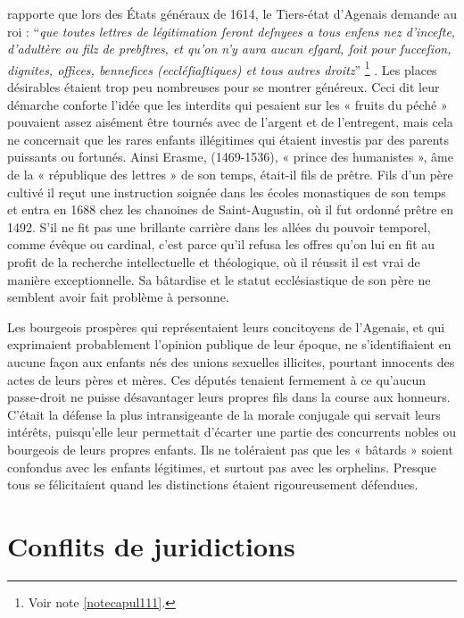   rapporte que lors des États généraux de 1614, le Tiers-état d'Agenais demande au roi : \enquote{\emph{que toutes lettres de légitimation ſeront deſnyees a tous enfens nez d'inceſte, d'adultère ou filz de prebſtres, et qu'on n'y aura aucun eſgard, ſoit pour ſucceſion, dignites, offices, bennefices (eccléſiaſtiques) et tous autres droitz}}%
\footnote{%
Voir note \ref{notecapul111}.}%
. Les places désirables étaient trop peu nombreuses pour se montrer généreux. Ceci dit leur démarche conforte l'idée que les interdits qui pesaient sur les « fruits du péché » pouvaient assez aisément être tournés avec de l'argent et de l'entregent, mais cela ne concernait que les rares enfants illégitimes qui étaient investis par des parents puissants ou fortunés. Ainsi Erasme, (1469-1536), « prince des humanistes », âme de la « république des lettres » de son temps, était-il fils de prêtre. Fils d'un père cultivé il reçut une instruction soignée dans les écoles monastiques de son temps et entra en 1688 chez les chanoines de Saint-Augustin, où il fut ordonné prêtre en 1492. S'il ne fit pas une brillante carrière dans les allées du pouvoir temporel, comme évêque ou cardinal, c'est parce qu'il refusa les offres qu'on lui en fit au profit de la recherche intellectuelle et théologique, où il réussit il est vrai de manière exceptionnelle. Sa bâtardise et le statut ecclésiastique de son père ne semblent avoir fait problème à personne.

 Les bourgeois prospères qui représentaient leurs concitoyens de l'Agenais, et qui exprimaient probablement l'opinion publique de leur époque, ne s'identifiaient en aucune façon aux enfants nés des unions sexuelles illicites, pourtant innocents des actes de leurs pères et mères. Ces députés tenaient fermement à ce qu'aucun passe-droit ne puisse désavantager leurs propres fils dans la course aux honneurs. C'était la défense la plus intransigeante de la morale conjugale qui servait leurs intérêts, puisqu'elle leur permettait d'écarter une partie des concurrents nobles ou bourgeois de leurs propres enfants. Ils ne toléraient pas que les « bâtards » soient confondus avec les enfants légitimes, et surtout pas avec les orphelins. Presque tous se félicitaient quand les distinctions étaient rigoureusement défendues.
 
 

\section{Conflits de juridictions}

